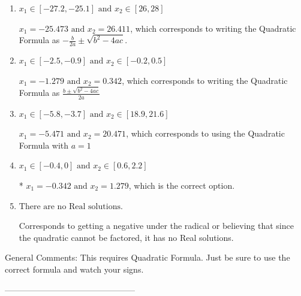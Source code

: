 \documentclass{extbook}[14pt]
\begin{document}
\begin{enumerate}[label=\Alph*.] 
\item $ x_1 \in [-27.2, -25.1] \text{ and } x_2 \in [26, 28] $ 

  $x_1 = -25.473 \text{ and } x_2 = 26.411$, which corresponds to writing the Quadratic Formula as $-\frac{b}{2a} \pm \sqrt{b^2 - 4ac}$. 
\item $ x_1 \in [-2.5, -0.9] \text{ and } x_2 \in [-0.2, 0.5] $ 

  $x_1 = -1.279 \text{ and } x_2 = 0.342$, which corresponds to writing the Quadratic Formula as $\frac{b \pm \sqrt{b^2 - 4ac}}{2a}$ 
\item $ x_1 \in [-5.8, -3.7] \text{ and } x_2 \in [18.9, 21.6] $ 

  $x_1 = -5.471 \text{ and } x_2 = 20.471$, which corresponds to using the Quadratic Formula with $a=1$ 
\item $ x_1 \in [-0.4, 0] \text{ and } x_2 \in [0.6, 2.2] $ 

 * $x_1 = -0.342 \text{ and } x_2 = 1.279$, which is the correct option. 
\item $ \text{There are no Real solutions.} $ 

 Corresponds to getting a negative under the radical or believing that since the quadratic cannot be factored, it has no Real solutions. 
\end{enumerate} 
 
General Comments: This requires Quadratic Formula. Just be sure to use the correct formula and watch your signs.

-----------------------------------------------
\end{document}
